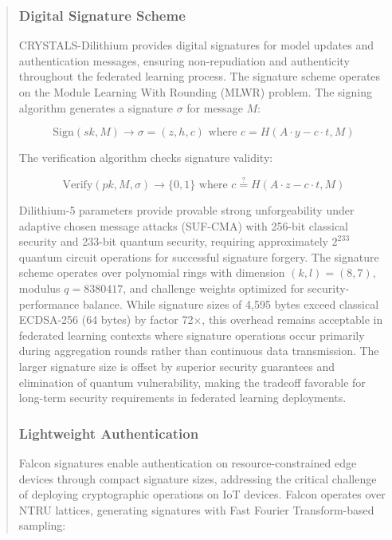 \documentclass{svproc}
\begin{document}
\begin{abstract}
\subsubsection{Digital Signature Scheme}

CRYSTALS-Dilithium provides digital signatures for model updates and authentication messages, ensuring non-repudiation and authenticity throughout the federated learning process. The signature scheme operates on the Module Learning With Rounding (MLWR) problem. The signing algorithm generates a signature $\sigma$ for message $M$:

\begin{equation}
\text{Sign}(sk, M) \rightarrow \sigma = (z, h, c) \text{ where } c = H(A \cdot y - c \cdot t, M)
\end{equation}

The verification algorithm checks signature validity:

\begin{equation}
\text{Verify}(pk, M, \sigma) \rightarrow \{0, 1\} \text{ where } c \stackrel{?}{=} H(A \cdot z - c \cdot t, M)
\end{equation}

Dilithium-5 parameters provide provable strong unforgeability under adaptive chosen message attacks (SUF-CMA) with 256-bit classical security and 233-bit quantum security, requiring approximately $2^{233}$ quantum circuit operations for successful signature forgery. The signature scheme operates over polynomial rings with dimension $(k, l) = (8, 7)$, modulus $q = 8380417$, and challenge weights optimized for security-performance balance. While signature sizes of 4,595 bytes exceed classical ECDSA-256 (64 bytes) by factor 72×, this overhead remains acceptable in federated learning contexts where signature operations occur primarily during aggregation rounds rather than continuous data transmission. The larger signature size is offset by superior security guarantees and elimination of quantum vulnerability, making the tradeoff favorable for long-term security requirements in federated learning deployments.

\subsubsection{Lightweight Authentication}

Falcon signatures enable authentication on resource-constrained edge devices through compact signature sizes, addressing the critical challenge of deploying cryptographic operations on IoT devices. Falcon operates over NTRU lattices, generating signatures with Fast Fourier Transform-based sampling:


\end{abstract}
\end{document}
